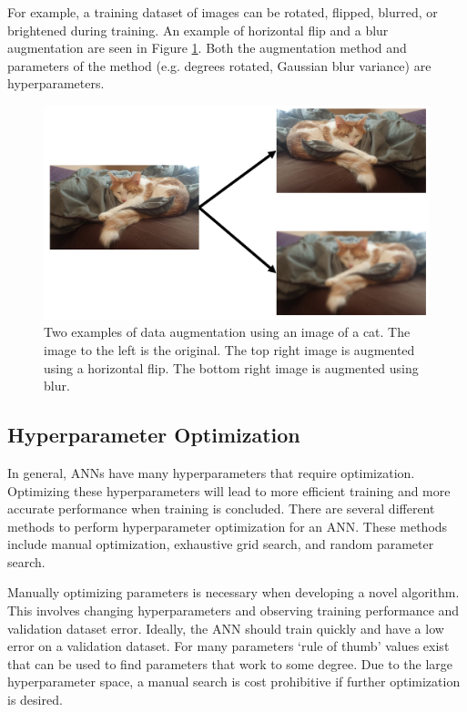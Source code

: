 For example, a training dataset of images can be rotated, flipped, blurred, or brightened during training. An example of horizontal flip and a blur augmentation are seen in Figure \ref{fig:cat}. Both the augmentation method and parameters of the method (e.g. degrees rotated, Gaussian blur variance) are hyperparameters.



\begin{figure}[H]
	\centering
	\includegraphics[width=0.9\linewidth]{images/cat}
	\caption{Two examples of data augmentation using an image of a cat. The image to the left is the original. The top right image is augmented using a horizontal flip. The bottom right image is augmented using blur.}
	\label{fig:cat}
\end{figure}

\subsection{Hyperparameter Optimization} \label{section_hp_opt}

In general, ANNs have many hyperparameters that require optimization. Optimizing these hyperparameters will lead to more efficient training and more accurate performance when training is concluded. There are several different methods to perform hyperparameter optimization for an ANN. These methods include manual optimization, exhaustive grid search, and random parameter search.

Manually optimizing parameters is necessary when developing a novel algorithm. This involves changing hyperparameters and observing training performance and validation dataset error. Ideally, the ANN should train quickly and have a low error on a validation dataset. For many parameters `rule of thumb' values exist that can be used to find parameters that work to some degree. Due to the large hyperparameter space, a manual search is cost prohibitive if further optimization is desired.

